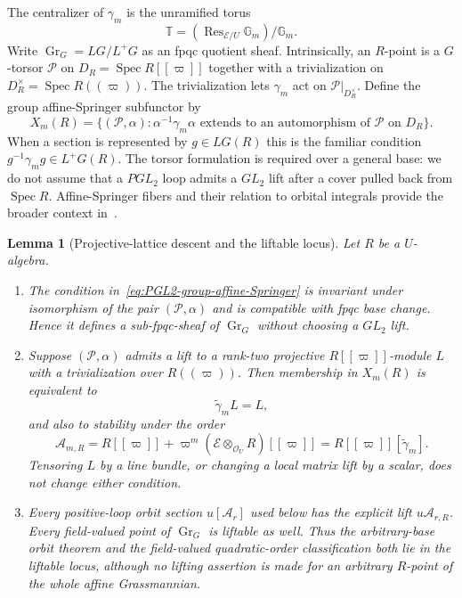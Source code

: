 \documentclass[11pt]{article}
\newtheorem{lemma}[theorem]{Lemma}
\theoremstyle{definition}
\theoremstyle{remark}
\newcommand{\Spec}{\operatorname{Spec}}
\begin{document}
The centralizer of $\gamma_m$ is the unramified torus
\begin{equation}
 \mathbb T=(\operatorname{Res}_{\mathcal E/U}\mathbb G_m)/\mathbb G_m.
 \label{eq:PGL2-centralizer-torus}
\end{equation}
Write $\operatorname{Gr}_G=LG/L^+G$ as an fpqc quotient sheaf.  Intrinsically,
an $R$-point is a $G$-torsor $\mathcal P$ on
$D_R=\Spec R[[\varpi]]$ together with a trivialization on
$D_R^\times=\Spec R((\varpi))$.  The trivialization lets $\gamma_m$ act on
$\mathcal P|_{D_R^\times}$.  Define the group affine-Springer subfunctor by
\begin{equation}
 X_m(R)=\{(\mathcal P,\alpha):
 \alpha^{-1}\gamma_m\alpha\text{ extends to an automorphism of }\mathcal P
 \text{ on }D_R\}.
 \label{eq:PGL2-group-affine-Springer}
\end{equation}
When a section is represented by $g\in LG(R)$ this is the familiar condition
$g^{-1}\gamma_mg\in L^+G(R)$.  The torsor formulation is required over a
general base: we do not assume that a $PGL_2$ loop admits a $GL_2$ lift after
a cover pulled back from $\Spec R$.  Affine-Springer fibers and their relation to orbital
integrals provide the broader context in~\cite{GKM}.

\begin{lemma}[Projective-lattice descent and the liftable locus]
\label{lem:PGL2-functorial-lattice-condition}
Let $R$ be a $U$-algebra.
\begin{enumerate}[label=\textup{(\roman*)}]
\item The condition in~\eqref{eq:PGL2-group-affine-Springer} is invariant under
  isomorphism of the pair $(\mathcal P,\alpha)$ and is compatible with fpqc
  base change.  Hence it defines a sub-fpqc-sheaf of
  $\operatorname{Gr}_G$ without choosing a $GL_2$ lift.
\item Suppose $(\mathcal P,\alpha)$ admits a lift to a rank-two projective
  $R[[\varpi]]$-module $L$ with a trivialization over $R((\varpi))$.
  Then membership in $X_m(R)$ is equivalent to
  \[
   \widetilde\gamma_mL=L,
  \]
  and also to stability under the order
  \[
   \mathcal A_{m,R}=R[[\varpi]]+\varpi^m
   (\mathcal E\otimes_{\mathcal O_U}R)[[\varpi]]
   =R[[\varpi]][\widetilde\gamma_m].
  \]
  Tensoring $L$ by a line bundle, or changing a local matrix lift by a
  scalar, does not change either condition.
\item Every positive-loop orbit section $u[\mathcal A_r]$ used below has the
  explicit lift $u\mathcal A_{r,R}$.  Every field-valued point of
  $\operatorname{Gr}_G$ is liftable as well.  Thus the arbitrary-base orbit
  theorem and the field-valued quadratic-order classification both lie in
  the liftable locus, although no lifting assertion is made for an arbitrary
  $R$-point of the whole affine Grassmannian.
\end{enumerate}
\end{lemma}
\end{document}
